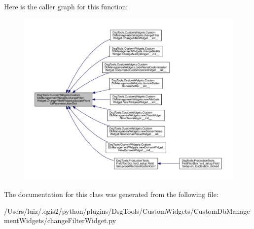 Here is the caller graph for this function\+:
\nopagebreak
\begin{figure}[H]
\begin{center}
\leavevmode
\includegraphics[width=350pt]{class_dsg_tools_1_1_custom_widgets_1_1_custom_db_management_widgets_1_1change_filter_widget_1_1_change_filter_widget_a05e71bee08fa2f3dcc25546f6feaf891_icgraph}
\end{center}
\end{figure}


The documentation for this class was generated from the following file\+:\begin{DoxyCompactItemize}
\item 
/\+Users/luiz/.\+qgis2/python/plugins/\+Dsg\+Tools/\+Custom\+Widgets/\+Custom\+Db\+Management\+Widgets/change\+Filter\+Widget.\+py\end{DoxyCompactItemize}
